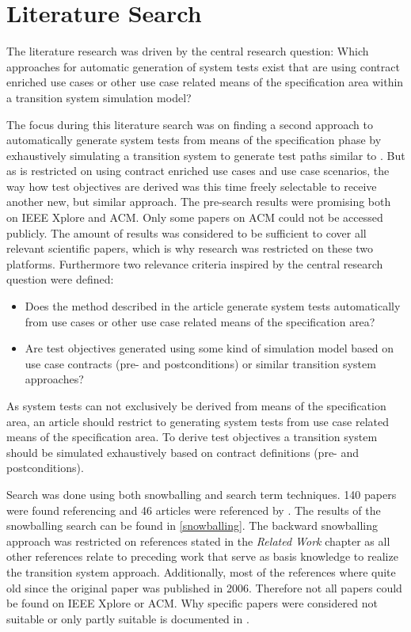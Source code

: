 \section{Literature Search} \label{literaturesearch}

The literature research was driven by the central research question: \glqq Which approaches for automatic generation of system tests exist that are using contract enriched use cases or other use case related means of the specification area within a transition system simulation model?\grqq 

The focus during this literature search was on finding a second approach to automatically generate system tests from means of the specification phase by exhaustively simulating a transition system to generate test paths similar to \cite{ClementineNebut2006}. But as \cite{ClementineNebut2006} is restricted on using contract enriched use cases and use case scenarios, the way how test objectives are derived was this time freely selectable to receive another new, but similar approach. The pre-search results were promising both on IEEE Xplore and ACM. Only some papers on ACM could not be accessed publicly. The amount of results was considered to be sufficient to cover all relevant scientific papers, which is why research was restricted on these two platforms. Furthermore two relevance criteria inspired by the central research question were defined:

\begin{itemize}
	\item Does the method described in the article generate system tests automatically from use cases or other use case related means of the specification area?
	\item Are test objectives generated using some kind of simulation model based on use case contracts (pre- and postconditions) or similar transition system approaches?
\end{itemize} 

As system tests can not exclusively be derived from means of the specification area, an article should restrict to generating system tests from use case related means of the specification area. To derive test objectives a transition system should be simulated exhaustively based on contract definitions (pre- and postconditions). 

Search was done using both snowballing and search term techniques. 140 papers were found referencing \cite{ClementineNebut2006} and 46 articles were referenced by \cite{ClementineNebut2006}. The results of the snowballing search can be found in \autoref{snowballing}. The backward snowballing approach was restricted on references stated in the \textit{Related Work} chapter as all other references relate to preceding work that serve as basis knowledge to realize the transition system approach. Additionally, most of the references where quite old since the original paper was published in 2006. Therefore not all papers could be found on IEEE Xplore or ACM. Why specific papers were considered not suitable or only partly suitable is documented in \cite{FelixHausberger2020}.


